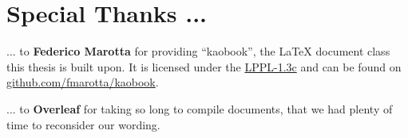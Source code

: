 \documentclass[
	fontsize=10pt, %
	twoside=false, %
	open=any, %
	numbers=noenddot, %
]{kaobook}
\begin{document}
\etocstandarddisplaystyle %
\etocstandardlines %

\tableofcontents %

\listoffigures %

\let\cleardoublepage\bigskip
\let\clearpage\bigskip

\listoftables %

\endgroup


\mainmatter %







\appendix %


\chapter*{Special Thanks ...}

... to \textbf{Federico Marotta} for providing \enquote{kaobook}, the \LaTeX{} document class this thesis is built upon. It is licensed under the \href{https://www.latex-project.org/lppl/lppl-1-3c/}{LPPL-1.3c} and can be found on \href{https://github.com/fmarotta/kaobook}{github.com/fmarotta/kaobook}.

... to \textbf{Overleaf} for taking so long to compile documents, that we had plenty of time to reconsider our wording.
\end{document}
